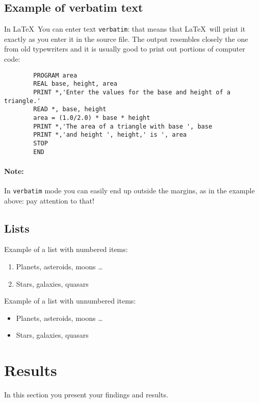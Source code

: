 \documentclass[a4paper,10pt]{article}
\begin{document}
\subsection{Example of verbatim text}
In \LaTeX\, You can enter text \texttt{verbatim}: that means that 
\LaTeX\, will print it exactly as you enter it in the source file. The
output resembles closely the one from old typewriters and it
is usually good to print out portions of computer code:

\begin{verbatim}
        PROGRAM area
        REAL base, height, area
        PRINT *,'Enter the values for the base and height of a triangle.'
        READ *, base, height
        area = (1.0/2.0) * base * height
        PRINT *,'The area of a triangle with base ', base
        PRINT *,'and height ', height,' is ', area
        STOP
        END
\end{verbatim}

\paragraph{Note:}
In \texttt{verbatim} mode you can easily end up outside the
margins, as in the example above: pay attention to that!

\subsection{Lists}
Example of a list with numbered items:

   \begin{enumerate}
      \item  Planets, asteroids, moons \ldots
      \item  Stars, galaxies, quasars
  \end{enumerate}

Example of a list with unnumbered items:

   \begin{itemize}
      \item  Planets, asteroids, moons \ldots
      \item  Stars, galaxies, quasars
          
   \end{itemize}

\section{Results}
In this section you present your findings and results.
\end{document}
